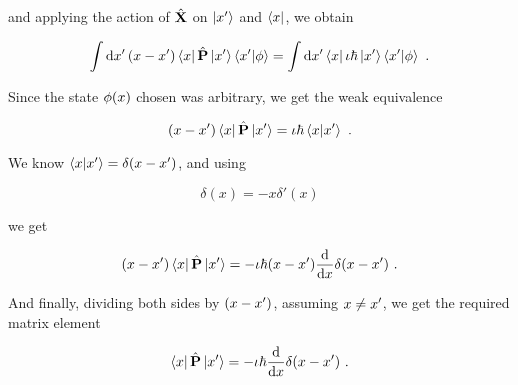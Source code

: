 and applying the action of $\hat{\textbf{X}}$ on $\ket{x'}$
and $\bra{x}$, we obtain

\begin{equation}
    \int \dd{x'} (x - x')\bra{x}\hat{\textbf{P}}
    \ket{x'}\braket{x'}{\phi} =
    \int \dd{x'} \bra{x}\iota \hbar
    \ket{x'}\braket{x'}{\phi}~.
\end{equation}

Since the state $\phi(x)$ chosen was arbitrary,
we get the weak equivalence

\begin{equation}
    (x - x')\bra{x}\hat{\textbf{P}}\ket{x'} =
    \iota \hbar \braket{x}{x'}~.
\end{equation}

We know $\braket{x}{x'} = \delta(x - x')$, and using

\begin{equation}
    \delta(x) = -x\delta'(x)
    \nonumber
\end{equation}

we get

\begin{equation}
    (x - x')\bra{x}\hat{\textbf{P}}\ket{x'} =
    - \iota \hbar (x - x') \dv{}{x}
    \delta(x - x')~.
\end{equation}

And finally, dividing both sides by $(x - x')$, assuming
$x \not = x'$, we get the required matrix element

\begin{equation}
    \bra{x}\hat{\textbf{P}}\ket{x'} =
    - \iota \hbar \dv{}{x}\delta(x - x')~.
\end{equation}

\begin{flushright}
    \qedsymbol
\end{flushright}

